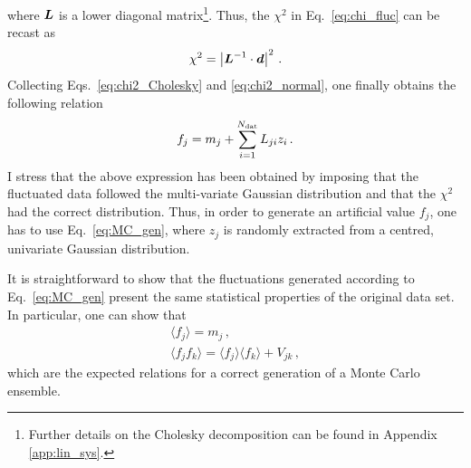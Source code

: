 where $\vb*{L}$ is a lower diagonal matrix\footnote{Further details on the Cholesky decomposition can be found in Appendix \ref{app:lin_sys}.}. Thus, the $\chi^2$ in Eq.~\eqref{eq:chi_fluc} can be recast as
\begin{equation}
  \chi^2 = \left| \vb*{L}^{-1} \cdot \vb*{d} \right|^2 \,.
  \label{eq:chi2_Cholesky}
\end{equation}
Collecting Eqs.~\eqref{eq:chi2_Cholesky} and \eqref{eq:chi2_normal}, one finally obtains the following relation
\begin{equation}
  f_j = m_j + \sum_{i=1}^{N_{\textrm{dat}}} L_{ji} z_i\,.
  \label{eq:MC_gen}
\end{equation}
I stress that the above expression has been obtained by imposing that the fluctuated data followed the multi-variate Gaussian distribution and that the $\chi^2$ had the correct distribution. Thus, in order to generate an artificial value $f_j$, one has to use Eq.~\eqref{eq:MC_gen}, where $z_j$ is randomly extracted from a centred, univariate Gaussian distribution.%

It is straightforward to show that the fluctuations generated according to Eq.~\eqref{eq:MC_gen} present the same statistical properties of the original data set. In particular, one can show that
\begin{gather}
  \langle f_j \rangle = m_j \,,\\
  \langle f_j f_k \rangle = \langle f_j \rangle \langle f_k \rangle + V_{jk} \,,
\end{gather}
which are the expected relations for a correct generation of a Monte Carlo ensemble.

